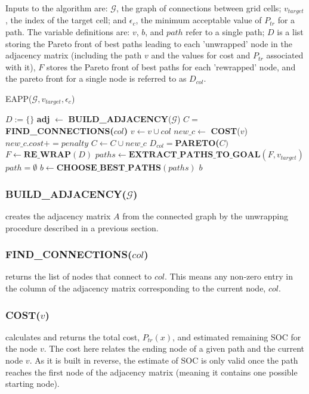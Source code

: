 \documentclass[journal]{IEEEtran}
\newcounter{row}
\newcounter{col}
\begin{document}
Inputs to the algorithm are: $\mathcal{G}$, the graph of connections between grid cells; $v_{target}$, the index of the target cell; and $\epsilon_c$, the minimum acceptable value of $P_{tr}$ for a path. The variable definitions are: $v$, $b$, and $path$ refer to a single path; $D$ is a list storing the Pareto front of best paths leading to each 'unwrapped' node in the adjacency matrix (including the path $v$ and the values for cost and $P_{tr}$ associated with it), $F$ stores the Pareto front of best paths for each 'rewrapped' node, and the pareto front for a single node is referred to as $D_{col}$.
\bigskip

\textsc{EAPP}($\mathcal{G}, v_{target}, \epsilon_c$)
\begin{algorithmic}[1]
\STATE $D:=\{\}$ 
\STATE \textbf{adj} $\leftarrow$ \textbf{BUILD\_ADJACENCY}($\mathcal{G}$)
\STATE $C =$ \textbf{FIND\_CONNECTIONS($col$)}
\STATE $v  \leftarrow v \cup col$ 
\STATE $new\_c \leftarrow$ \textbf{COST}($v$)
\STATE $new\_c.cost += penalty $ 
\ENDIF
\STATE $C \leftarrow C \cup new\_c$ 
\STATE $D_{col} = $\textbf{PARETO($C)$}
\ENDFOR
\ENDFOR
\STATE $F \leftarrow \textbf{RE\_WRAP}(D)$
\STATE $paths \leftarrow \textbf{EXTRACT\_PATHS\_TO\_GOAL}(F, v_{target})$
\STATE $path = \emptyset$
\ENDIF
\ENDFOR
\STATE $b \leftarrow \textbf{CHOOSE\_BEST\_PATHS}(paths)$
\RETURN $b$
\end{algorithmic}

\subsubsection{BUILD\_ADJACENCY($\mathcal{G}$)} creates the adjacency matrix $A$ from the connected graph by the unwrapping procedure described in a previous section.
\subsubsection{FIND\_CONNECTIONS($col$)} returns the list of nodes that connect to $col$. This means any non-zero entry in the column of the adjacency matrix corresponding to the current node, $col$.
\subsubsection{COST($v$)} calculates and returns the total cost, $P_{tr}(x)$, and estimated remaining SOC for the node $v$. The cost here relates the ending node of a given path and the current node $v$. As it is built in reverse, the estimate of SOC is only valid once the path reaches the first node of the adjacency matrix (meaning it contains one possible starting node).
\end{document}

